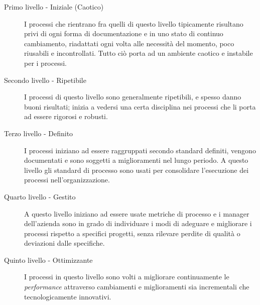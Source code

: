 		\begin{description}
			\item[Primo livello - Iniziale (Caotico)] I processi che rientrano fra quelli di questo livello tipicamente risultano privi di ogni forma di documentazione e in uno stato di continuo cambiamento, riadattati ogni volta alle necessità del momento, poco riusabili e incontrollati. Tutto ciò porta ad un ambiente caotico e instabile per i processi.
			\item[Secondo livello - Ripetibile] I processi di questo livello sono generalmente ripetibili, e spesso danno buoni risultati; inizia a vedersi una certa disciplina nei processi che li porta ad essere rigorosi e robusti.
			\item[Terzo  livello - Definito] I processi iniziano ad essere raggruppati secondo standard definiti, vengono documentati e sono soggetti a miglioramenti nel lungo periodo. A questo livello gli standard di processo sono usati per consolidare l'esecuzione dei processi nell'organizzazione.
			\item[Quarto livello - Gestito] A questo livello iniziano ad essere usate metriche di processo e i manager dell'azienda sono in grado di individuare i modi di adeguare e migliorare i processi rispetto a specifici progetti, senza rilevare perdite di qualità o deviazioni dalle specifiche.
			\item[Quinto livello - Ottimizzante] I processi in questo livello sono volti a migliorare continuamente le \textit{performance} attraverso cambiamenti e miglioramenti sia incrementali che tecnologicamente innovativi.
		\end{description}

